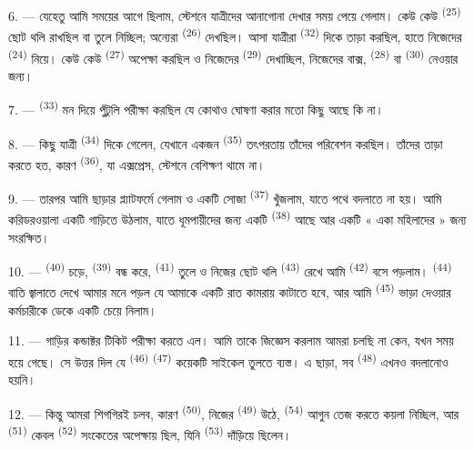 6. --- যেহেতু আমি সময়ের আগে ছিলাম, স্টেশনে যাত্রীদের আনাগোনা দেখার সময় পেয়ে
গেলাম। কেউ কেউ  \textsuperscript{(25)} ছোট থলি রাখছিল বা তুলে
নিচ্ছিল; অন্যেরা  \textsuperscript{(26)} দেখছিল। আসা যাত্রীরা
 \textsuperscript{(32)} দিকে তাড়া করছিল, হাতে নিজেদের
 \textsuperscript{(24)} নিয়ে। কেউ কেউ 
\textsuperscript{(27)} অপেক্ষা করছিল ও নিজেদের 
\textsuperscript{(29)} দেখাচ্ছিল, নিজেদের বাক্স, 
\textsuperscript{(28)} বা  \textsuperscript{(30)} নেওয়ার জন্য।

7. ---  \textsuperscript{(33)} মন দিয়ে পুঁটুলি
পরীক্ষা করছিল যে কোথাও ঘোষণা করার মতো কিছু আছে কি না।

8. --- কিছু যাত্রী  \textsuperscript{(34)} দিকে গেলেন,
যেখানে একজন  \textsuperscript{(35)} তৎপরতায় তাঁদের পরিবেশন করছিল।
তাঁদের তাড়া করতে হত, কারণ  \textsuperscript{(36)}, যা এক্সপ্রেস,
স্টেশনে বেশিক্ষণ থামে না।

9. --- তারপর আমি ছাড়ার প্ল্যাটফর্মে গেলাম ও একটি সোজা 
\textsuperscript{(37)} খুঁজলাম, যাতে পথে বদলাতে না হয়। আমি করিডরওয়ালা একটি
গাড়িতে উঠলাম, যাতে ধূমপায়ীদের জন্য একটি  \textsuperscript{(38)}
আছে আর একটি « একা মহিলাদের » জন্য সংরক্ষিত।

\VUsaut{3.0mm}

10. ---  \textsuperscript{(40)} চড়ে, 
\textsuperscript{(39)} বন্ধ করে,  \textsuperscript{(41)} তুলে ও নিজের
ছোট থলি  \textsuperscript{(43)} রেখে আমি 
\textsuperscript{(42)} বসে পড়লাম।  \textsuperscript{(44)}
বাতি জ্বালাতে দেখে আমার মনে পড়ল যে আমাকে একটি রাত কামরায় কাটাতে হবে, আর আমি
 \textsuperscript{(45)} ভাড়া দেওয়ার কর্মচারীকে ডেকে একটি চেয়ে
নিলাম।

11. --- গাড়ির কন্ডাক্টর টিকিট পরীক্ষা করতে এল। আমি তাকে জিজ্ঞেস করলাম আমরা
চলছি না কেন, যখন সময় হয়ে গেছে। সে উত্তর দিল যে 
\textsuperscript{(46)}  \textsuperscript{(47)} কয়েকটি
সাইকেল তুলতে ব্যস্ত। এ ছাড়া, সব 
\textsuperscript{(48)} এখনও বদলানোও হয়নি।

12. --- কিন্তু আমরা শিগগিরই চলব, কারণ 
\textsuperscript{(50)}, নিজের  \textsuperscript{(49)}
উঠে,  \textsuperscript{(54)} আগুন তেজ করতে কয়লা নিচ্ছিল, আর
 \textsuperscript{(51)} কেবল 
\textsuperscript{(52)} সংকেতের অপেক্ষায় ছিল, যিনি 
\textsuperscript{(53)} দাঁড়িয়ে ছিলেন।

